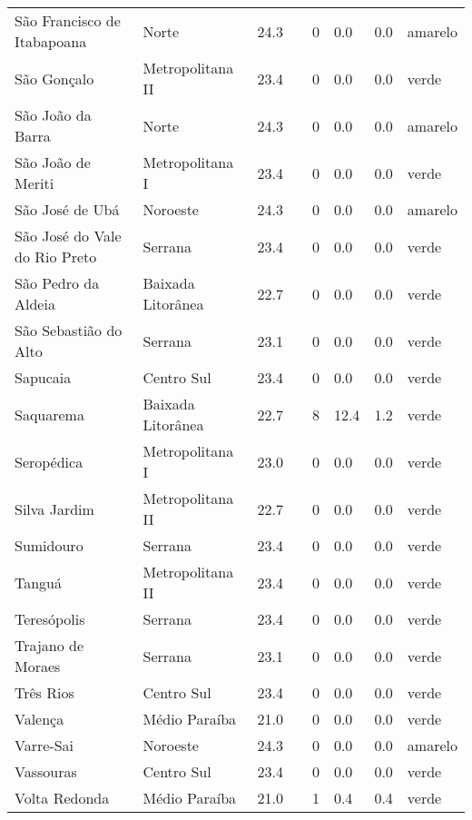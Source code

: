 \begin{longtable}{l|lllllll}
  São Francisco de Itabapoana & Norte & 24.3 &  & 0 & 0.0 & 0.0 & amarelo \\ 
  São Gonçalo & Metropolitana II & 23.4 &  & 0 & 0.0 & 0.0 & verde \\ 
  São João da Barra & Norte & 24.3 &  & 0 & 0.0 & 0.0 & amarelo \\ 
  São João de Meriti & Metropolitana I & 23.4 &  & 0 & 0.0 & 0.0 & verde \\ 
  São José de Ubá & Noroeste & 24.3 &  & 0 & 0.0 & 0.0 & amarelo \\ 
  São José do Vale do Rio Preto & Serrana & 23.4 &  & 0 & 0.0 & 0.0 & verde \\ 
  São Pedro da Aldeia & Baixada Litorânea & 22.7 &  & 0 & 0.0 & 0.0 & verde \\ 
  São Sebastião do Alto & Serrana & 23.1 &  & 0 & 0.0 & 0.0 & verde \\ 
  Sapucaia & Centro Sul & 23.4 &  & 0 & 0.0 & 0.0 & verde \\ 
  Saquarema & Baixada Litorânea & 22.7 &  & 8 & 12.4 & 1.2 & verde \\ 
  Seropédica & Metropolitana I & 23.0 &  & 0 & 0.0 & 0.0 & verde \\ 
  Silva Jardim & Metropolitana II & 22.7 &  & 0 & 0.0 & 0.0 & verde \\ 
  Sumidouro & Serrana & 23.4 &  & 0 & 0.0 & 0.0 & verde \\ 
  Tanguá & Metropolitana II & 23.4 &  & 0 & 0.0 & 0.0 & verde \\ 
  Teresópolis & Serrana & 23.4 &  & 0 & 0.0 & 0.0 & verde \\ 
  Trajano de Moraes & Serrana & 23.1 &  & 0 & 0.0 & 0.0 & verde \\ 
  Três Rios & Centro Sul & 23.4 &  & 0 & 0.0 & 0.0 & verde \\ 
  Valença & Médio Paraíba & 21.0 &  & 0 & 0.0 & 0.0 & verde \\ 
  Varre-Sai & Noroeste & 24.3 &  & 0 & 0.0 & 0.0 & amarelo \\ 
  Vassouras & Centro Sul & 23.4 &  & 0 & 0.0 & 0.0 & verde \\ 
  Volta Redonda & Médio Paraíba & 21.0 &  & 1 & 0.4 & 0.4 & verde \\ 
  \hline
\end{longtable}
